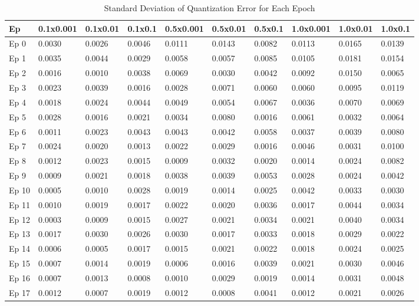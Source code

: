\begin{table}[htbp]
\centering
\caption{Standard Deviation of Quantization Error for Each Epoch}
\begin{tabular}{|l|l|l|l|l|l|l|l|l|l|}
\hline
Ep & 0.1x0.001 & 0.1x0.01 & 0.1x0.1 & 0.5x0.001 & 0.5x0.01 & 0.5x0.1 & 1.0x0.001 & 1.0x0.01 & 1.0x0.1 \\
\hline
Ep 0 & 0.0030 & 0.0026 & 0.0046 & 0.0111 & 0.0143 & 0.0082 & 0.0113 & 0.0165 & 0.0139  \\
Ep 1 & 0.0035 & 0.0044 & 0.0029 & 0.0058 & 0.0057 & 0.0085 & 0.0105 & 0.0181 & 0.0154  \\
Ep 2 & 0.0016 & 0.0010 & 0.0038 & 0.0069 & 0.0030 & 0.0042 & 0.0092 & 0.0150 & 0.0065  \\
Ep 3 & 0.0023 & 0.0039 & 0.0016 & 0.0028 & 0.0071 & 0.0060 & 0.0060 & 0.0095 & 0.0119  \\
Ep 4 & 0.0018 & 0.0024 & 0.0044 & 0.0049 & 0.0054 & 0.0067 & 0.0036 & 0.0070 & 0.0069  \\
Ep 5 & 0.0028 & 0.0016 & 0.0021 & 0.0034 & 0.0080 & 0.0016 & 0.0061 & 0.0032 & 0.0064  \\
Ep 6 & 0.0011 & 0.0023 & 0.0043 & 0.0043 & 0.0042 & 0.0058 & 0.0037 & 0.0039 & 0.0080  \\
Ep 7 & 0.0024 & 0.0020 & 0.0013 & 0.0022 & 0.0029 & 0.0016 & 0.0046 & 0.0031 & 0.0100  \\
Ep 8 & 0.0012 & 0.0023 & 0.0015 & 0.0009 & 0.0032 & 0.0020 & 0.0014 & 0.0024 & 0.0082  \\
Ep 9 & 0.0009 & 0.0021 & 0.0018 & 0.0038 & 0.0039 & 0.0053 & 0.0028 & 0.0024 & 0.0042  \\
Ep 10 & 0.0005 & 0.0010 & 0.0028 & 0.0019 & 0.0014 & 0.0025 & 0.0042 & 0.0033 & 0.0030  \\
Ep 11 & 0.0010 & 0.0019 & 0.0017 & 0.0022 & 0.0020 & 0.0036 & 0.0017 & 0.0044 & 0.0034  \\
Ep 12 & 0.0003 & 0.0009 & 0.0015 & 0.0027 & 0.0021 & 0.0034 & 0.0021 & 0.0040 & 0.0034  \\
Ep 13 & 0.0017 & 0.0030 & 0.0026 & 0.0030 & 0.0017 & 0.0033 & 0.0018 & 0.0029 & 0.0022  \\
Ep 14 & 0.0006 & 0.0005 & 0.0017 & 0.0015 & 0.0021 & 0.0022 & 0.0018 & 0.0024 & 0.0025  \\
Ep 15 & 0.0007 & 0.0014 & 0.0019 & 0.0006 & 0.0016 & 0.0039 & 0.0021 & 0.0030 & 0.0046  \\
Ep 16 & 0.0007 & 0.0013 & 0.0008 & 0.0010 & 0.0029 & 0.0019 & 0.0014 & 0.0031 & 0.0048  \\
Ep 17 & 0.0012 & 0.0007 & 0.0019 & 0.0012 & 0.0008 & 0.0041 & 0.0012 & 0.0021 & 0.0026  \\

\end{tabular}
\end{table}

